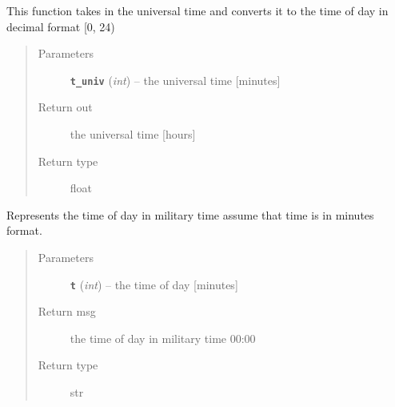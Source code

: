 \documentclass[letterpaper,10pt,english]{sphinxmanual}
\begin{document}

\begin{fulllineitems}
\label{temporal:temporal.convert_universal_to_decimal}
This function takes in the universal time and converts it to the time of day in decimal format {[}0, 24)
\begin{quote}\begin{description}
\item[{Parameters}] \leavevmode
\textbf{\texttt{t\_univ}} (\emph{int}) -- the universal time {[}minutes{]}

\item[{Return out}] \leavevmode
the universal time {[}hours{]}

\item[{Return type}] \leavevmode
float

\end{description}\end{quote}

\end{fulllineitems}


\begin{fulllineitems}
\label{temporal:temporal.print_military_time}
Represents the time of day in military time  assume that time is in minutes format.
\begin{quote}\begin{description}
\item[{Parameters}] \leavevmode
\textbf{\texttt{t}} (\emph{int}) -- the time of day {[}minutes{]}

\item[{Return msg}] \leavevmode
the time of day in military time 00:00

\item[{Return type}] \leavevmode
str

\end{description}\end{quote}

\end{fulllineitems}
\end{document}
